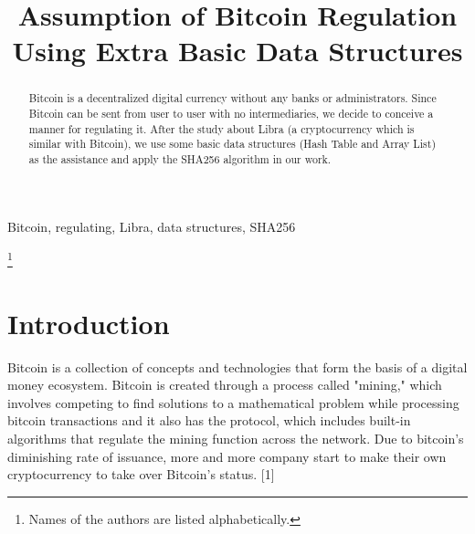 \documentclass[conference]{IEEEtran}
\begin{document}
\title{Assumption of Bitcoin Regulation Using Extra Basic Data Structures \\
}

\author{
\and
{}
\and
{}
}

\maketitle

\begin{abstract}
Bitcoin is a decentralized digital currency without any banks or administrators. Since Bitcoin can be sent from user to user with no intermediaries, we decide to conceive a manner for regulating it. After the study about Libra (a cryptocurrency which is similar with Bitcoin), we use some basic data structures (Hash Table and Array List) as the assistance and apply the SHA256 algorithm in our work. 
\end{abstract}

\begin{IEEEkeywords}
Bitcoin, regulating, Libra, data structures, SHA256
\end{IEEEkeywords}
\footnote{Names of the authors are listed alphabetically.}

\section{Introduction}
Bitcoin is a collection of concepts and technologies that form the basis of a digital money ecosystem.  Bitcoin is created through a process called "mining," which involves competing to find solutions to a mathematical problem while processing bitcoin transactions and it also has the protocol, which includes built-in algorithms that regulate the mining function across the network. Due to bitcoin’s diminishing rate of issuance, more and more company start to make their own cryptocurrency to take over Bitcoin’s status. [1]
\end{document}
